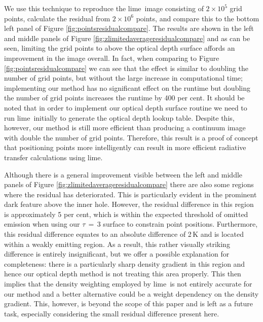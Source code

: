 \documentclass[fleqn,usenatbib]{mnras}
\newcommand{\lime}{{\sc lime}}
\begin{document}
We use this technique to reproduce the \lime\ image consisting of $2 \times 10^5$ grid points, calculate the residual from $2 \times 10^6$ points, and compare this to the bottom left panel of Figure \ref{fig:pointsresidualcompare}. The results are shown in the left and middle panels of Figure \ref{fig:zlimitedaverageresidualcompare} and as can be seen, limiting the grid points to above the optical depth surface affords an improvement in the image overall. In fact, when comparing to Figure \ref{fig:pointsresidualcompare} we can see that the effect is similar to doubling the number of grid points, but without the large increase in computational time; implementing our method has no significant effect on the runtime but doubling the number of grid points increases the runtime by 400 per cent. It should be noted that in order to implement our optical depth surface routine we need to run \lime\ initially to generate the optical depth lookup table. Despite this, however, our method is still more efficient than producing a continuum image with double the number of grid points. Therefore, this result is a proof of concept that positioning points more intelligently can result in more efficient radiative transfer calculations using \lime.

\smallskip

Although there is a general improvement visible between the left and middle panels of Figure \ref{fig:zlimitedaverageresidualcompare} there are also some regions where the residual has deteriorated. This is particularly evident in the prominent dark feature above the inner hole. However, the residual difference in this region is approximately 5 per cent, which is within the expected threshold of omitted emission when using our $\tau\,=\,3$ surface to constrain point positions. Furthermore, this residual difference equates to an absolute difference of 2\,K and is located within a weakly emitting region. As a result, this rather visually striking difference is entirely insignificant, but we offer a possible explanation for completeness: there is a particularly sharp density gradient in this region and hence our optical depth method is not treating this area properly. This then implies that the density weighting employed by \lime\ is not entirely accurate for our method and a better alternative could be a weight dependency on the density gradient. This, however, is beyond the scope of this paper and is left as a future task, especially considering the small residual difference present here.

\smallskip
\end{document}

